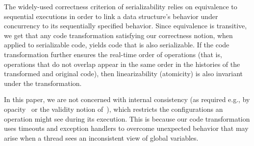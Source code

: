The widely-used correctness criterion of serializability relies on equivalence to sequential executions in order to
link a data structure's behavior under concurrency to its sequentially specified behavior. Since equivalence is transitive, 
we get that any code transformation satisfying our correctness notion, when applied to serializable code, yields code that is also serializable.
If the code transformation further ensures the real-time order of operations (that is, operations that do not overlap appear in the same order in the
histories of the transformed and original code), then linearizability (atomicity) is also invariant under the transformation.

In this paper, we are not concerned with internal consistency (as required e.g., by opacity~\cite{GuerraouiK2008} or the validity notion of~\cite{LevAriCK2014}), 
which restricts the configurations an operation might see during its execution. 
This is because our code transformation uses timeouts and exception handlers to overcome unexpected behavior that may arise when a thread sees an inconsistent view of global variables. 


